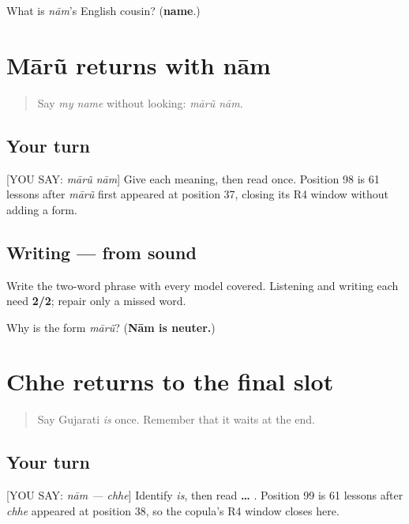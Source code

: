\begin{tcolorbox}[breakable,colback=teal!4,colframe=teal!35!black,title={Before you move on}]
What is \emph{nām}'s English cousin? (\textbf{name}.)
\end{tcolorbox}
\section[Practice]{Mārũ returns with nām}

\label{lesson:GU-R16-maarun-r4}



\begin{quote}
Say \emph{my name} without looking: \emph{mārũ nām}.
\end{quote}

\subsection*{Your turn}
{[}YOU SAY: \emph{mārũ nām}{]} Give each meaning, then read \textbf{ } once. Position 98 is 61 lessons after \emph{mārũ} first appeared at position 37, closing its R4 window without adding a form.

\subsection*{Writing — from sound}
Write the two-word phrase with every model covered. Listening and writing each need \textbf{2/2}; repair only a missed word.

\begin{tcolorbox}[breakable,colback=teal!4,colframe=teal!35!black,title={Before you move on}]
Why is the form \emph{mārũ}? (\textbf{Nām is neuter.})
\end{tcolorbox}
\section[Practice]{Chhe returns to the final slot}

\label{lesson:GU-R16-chhe-r4}



\begin{quote}
Say Gujarati \emph{is} once. Remember that it waits at the end.
\end{quote}

\subsection*{Your turn}
{[}YOU SAY: \emph{nām — chhe}{]} Identify \emph{is}, then read \textbf{ … }. Position 99 is 61 lessons after \emph{chhe} appeared at position 38, so the copula's R4 window closes here.

